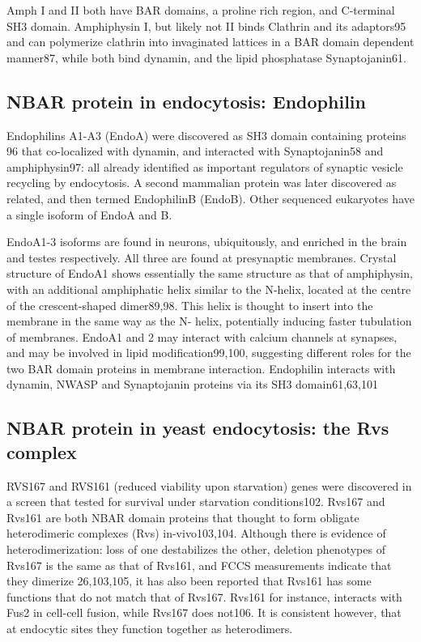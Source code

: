 	\vspace{5mm}
	Amph I and II both have BAR domains, a proline rich region, and C-terminal SH3 domain.
Amphiphysin I, but likely not II binds Clathrin and its adaptors95 and can polymerize clathrin into invaginated lattices in a BAR domain dependent manner87, while both bind dynamin, and the lipid phosphatase Synaptojanin61.


	\subsection{NBAR protein in endocytosis: Endophilin }	
	Endophilins A1-A3 (EndoA) were discovered as SH3 domain containing proteins 96 that co-localized with dynamin, and interacted with Synaptojanin58 and amphiphysin97: all already identified as important regulators of synaptic vesicle recycling by endocytosis. A second mammalian protein was later discovered as related, and then termed EndophilinB (EndoB). Other sequenced eukaryotes have a single isoform of EndoA and B.

	\vspace{5mm}
	EndoA1-3 isoforms are found in neurons, ubiquitously, and enriched in the brain and testes respectively. All three are found at presynaptic membranes. Crystal structure of EndoA1 shows essentially the same structure as that of amphiphysin, with an additional amphiphatic helix similar to the N-helix, located at the centre of the crescent-shaped dimer89,98. This helix is thought to insert into the membrane in the same way as the N- helix, potentially inducing faster tubulation of membranes. EndoA1 and 2 may interact with calcium channels at synapses, and may be involved in lipid modification99,100, suggesting different roles for the two BAR domain proteins in membrane interaction. Endophilin interacts with dynamin, NWASP and Synaptojanin proteins via its SH3 domain61,63,101



	\subsection{NBAR protein in yeast endocytosis: the Rvs complex}		
	RVS167 and RVS161 (reduced viability upon starvation) genes were discovered in a screen that tested for survival under starvation conditions102. Rvs167 and Rvs161 are both NBAR domain proteins that thought to form obligate heterodimeric complexes (Rvs) in-vivo103,104. Although there is evidence of heterodimerization: loss of one destabilizes the other, deletion phenotypes of Rvs167 is the same as that of Rvs161, and FCCS measurements indicate that they dimerize 26,103,105, it has also been reported that Rvs161 has some functions that do not match that of Rvs167. Rvs161 for instance, interacts with Fus2 in cell-cell fusion, while Rvs167 does not106. It is consistent however, that at endocytic sites they function together as heterodimers. 

